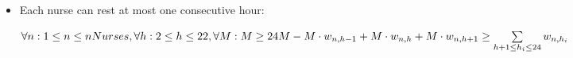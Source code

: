\begin{itemize}
\item  Each nurse can rest at most one consecutive hour:

$	
\forall n:  1 \leq n \leq nNurses, \forall h: 2 \leq h \leq 22, \forall M: M \geq 24  \\ M - M \cdot w_{n,h-1} + M \cdot w_{n,h} + M \cdot w_{n,h+1}  \geq \sum\limits_{h+1 \leq h_{i} \leq 24 }  w_{n,h_{i}} \\	 $	

\end{itemize}

\pagebreak